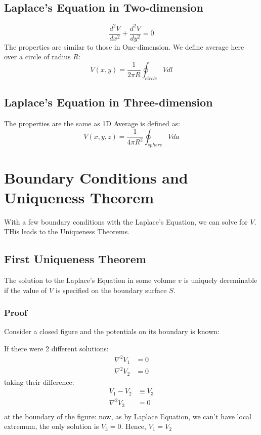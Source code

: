 \documentclass{article}
\begin{document}
\subsection{Laplace's Equation in Two-dimension}
\[ \frac{d^2 V}{dx^2} + \frac{d^2 V}{dy^2} = 0\]
The properties are similar to those in One-dimension.
We define average here over a circle of radius $R$:
\[ V(x,y) = \frac{1}{2 \pi R} \oint_{circle} V dl\]
\subsection{Laplace's Equation in Three-dimension}
The properties are the same as 1D
Average is defined as:
\[ V(x,y,z) = \frac{1}{4 \pi R^2} \oint_{sphere} V da\]

\section{Boundary Conditions and Uniqueness Theorem}
With a few boundary conditions with the Laplace's Equation, we can solve for $V$. THis leads to the Uniqueness Theorems.

\subsection{First Uniqueness Theorem}
The solution to the Laplace's Equation in some volume $v$ is uniquely dereminable if the value of $V$ is specified on the boundary surface $S$.
\subsubsection*{Proof}
Consider a closed figure and the potentials on its boundary is known:
\begin{figure}[H]
	\centering
\end{figure}
If there were 2 different solutions:\\
\begin{align*}
	\nabla^2 V_1 & = 0 \\
	\nabla^2 V_2 & = 0
\end{align*}
taking their difference:
\begin{align*}
	V_1 - V_2    & \equiv V_3 \\
	\nabla^2 V_3 & = 0        \\
\end{align*}
at the boundary of the figure:
now, as by Laplace Equation, we can't have local extremum, the only solution is \(V_3 = 0\).
Hence, \(V_1 = V_2\)
\end{document}
